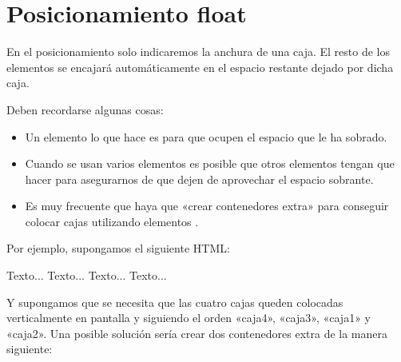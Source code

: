 \documentclass[letterpaper,10pt,spanish]{sphinxmanual}
\begin{document}
\section{Posicionamiento float}
\label{\detokenize{tema3:posicionamiento-float}}
En el posicionamiento  solo indicaremos la anchura de una caja. El resto de los elementos se encajará automáticamente en el espacio restante dejado por dicha caja.

Deben recordarse algunas cosas:
\begin{itemize}
\item {} 
Un elemento  lo que hace es  para que ocupen el espacio que le ha sobrado.

\item {} 
Cuando se usan varios elementos  es posible que otros elementos tengan que hacer  para asegurarnos de que dejen de aprovechar el espacio sobrante.

\item {} 
Es muy frecuente que haya que «crear contenedores extra» para conseguir colocar cajas utilizando elementos .

\end{itemize}

Por ejemplo, supongamos el siguiente HTML:

\begin{sphinxVerbatim}[commandchars=\\\{\}]
 
    Texto...
 
    Texto...
 
    Texto...
 
    Texto...
\end{sphinxVerbatim}

Y supongamos que se necesita que las cuatro cajas queden colocadas verticalmente en pantalla y siguiendo el orden «caja4», «caja3», «caja1» y «caja2». Una posible solución sería crear dos contenedores extra de la manera siguiente:
\end{document}
